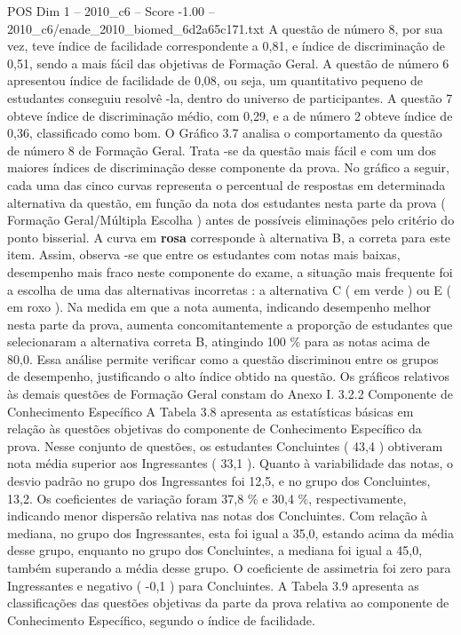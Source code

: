 \begin{textsample}{POS Dim 1 – 2010\_c6 – Score -1.00 – 2010\_c6/enade\_2010\_biomed\_6d2a65c171.txt}
A questão de número 8, por sua vez, teve índice de facilidade correspondente a 0,81, e índice de discriminação de 0,51, sendo a mais fácil das objetivas de Formação Geral.
A questão de número 6 apresentou índice de facilidade de 0,08, ou seja, um quantitativo pequeno de estudantes conseguiu resolvê -la, dentro do universo de participantes.
A questão 7 obteve índice de discriminação médio, com 0,29, e a de número 2 obteve índice de 0,36, classificado como bom.
O Gráfico 3.7 analisa o comportamento da questão de número 8 de Formação Geral.
Trata -se da questão mais fácil e com um dos maiores índices de discriminação desse componente da prova.
No gráfico a seguir, cada uma das cinco curvas representa o percentual de respostas em determinada alternativa da questão, em função da nota dos estudantes nesta parte da prova ( Formação Geral/Múltipla Escolha ) antes de possíveis eliminações pelo critério do ponto bisserial.
A curva em \textbf{rosa} corresponde à alternativa B, a correta para este item.
Assim, observa -se que entre os estudantes com notas mais baixas, desempenho mais fraco neste componente do exame, a situação mais frequente foi a escolha de uma das alternativas incorretas : a alternativa C ( em verde ) ou E ( em roxo ).
Na medida em que a nota aumenta, indicando desempenho melhor nesta parte da prova, aumenta concomitantemente a proporção de estudantes que selecionaram a alternativa correta B, atingindo 100 \% para as notas acima de 80,0.
Essa análise permite verificar como a questão discriminou entre os grupos de desempenho, justificando o alto índice obtido na questão.
Os gráficos relativos às demais questões de Formação Geral constam do Anexo I. 3.2.2 Componente de Conhecimento Específico A Tabela 3.8 apresenta as estatísticas básicas em relação às questões objetivas do componente de Conhecimento Específico da prova.
Nesse conjunto de questões, os estudantes Concluintes ( 43,4 ) obtiveram nota média superior aos Ingressantes ( 33,1 ).
Quanto à variabilidade das notas, o desvio padrão no grupo dos Ingressantes foi 12,5, e no grupo dos Concluintes, 13,2.
Os coeficientes de variação foram 37,8 \% e 30,4 \%, respectivamente, indicando menor dispersão relativa nas notas dos Concluintes.
Com relação à mediana, no grupo dos Ingressantes, esta foi igual a 35,0, estando acima da média desse grupo, enquanto no grupo dos Concluintes, a mediana foi igual a 45,0, também superando a média desse grupo.
O coeficiente de assimetria foi zero para Ingressantes e negativo ( -0,1 ) para Concluintes.
A Tabela 3.9 apresenta as classificações das questões objetivas da parte da prova relativa ao componente de Conhecimento Específico, segundo o índice de facilidade.

\end{textsample}

